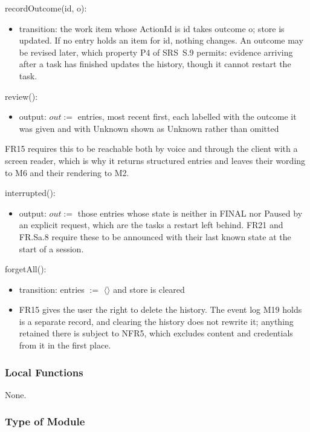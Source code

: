 \documentclass[12pt, titlepage]{article}
\begin{document}
\noindent recordOutcome(id, o):
\begin{itemize}
\item transition: the work item whose ActionId is id takes outcome o; store is
updated. If no entry holds an item for id, nothing changes. An outcome may be revised later, which property P4 of
SRS~S.9 permits: evidence arriving after a task has finished updates the
history, though it cannot restart the task.
\end{itemize}

\noindent review():
\begin{itemize}
\item output: $out :=$ entries, most recent first, each labelled with the
outcome it was given and with Unknown shown as Unknown rather than omitted
\end{itemize}

\noindent FR15 requires this to be reachable both by voice and through the
client with a screen reader, which is why it returns structured entries and
leaves their wording to M6 and their rendering to M2.

\noindent interrupted():
\begin{itemize}
\item output: $out :=$ those entries whose state is neither in FINAL nor Paused
by an explicit request, which are the tasks a restart left behind. FR21 and
FR.Sa.8 require these to be announced with their last known state at the start
of a session.
\end{itemize}

\noindent forgetAll():
\begin{itemize}
\item transition: entries $:=$ $\langle\rangle$ and store is cleared
\item FR15 gives the user the right to delete the history. The event log M19
holds is a separate record, and clearing the history does not rewrite it;
anything retained there is subject to NFR5, which excludes content and
credentials from it in the first place.
\end{itemize}

\subsubsection{Local Functions}

None.

\subsubsection{Type of Module}
\end{document}
